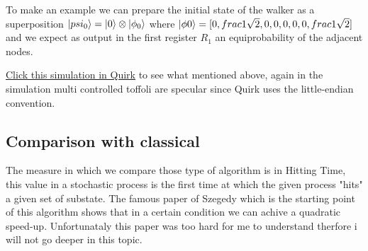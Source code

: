 To make an example we can prepare the initial state of the walker as a superposition $\ket{psi_{0}} = \ket{0} \otimes \ket{\phi_{0}}$
where $\ket{\phi{0}} = [0, frac{1}{\sqrt{2}}, 0 , 0, 0, 0, 0, frac{1}{\sqrt{2}}]$ and we expect as output in the first register $R_{1}$ an equiprobability of the adjacent nodes.

\href{https://algassert.com/quirk#circuit={%22cols%22:[[1,1,1,%22H%22,1,%22X%22],[1,1,1,%22%E2%80%A2%22,%22X%22],[1,1,1,%22Amps3%22],[],[1,1,1,%22Chance3%22],[1,1,%22%E2%80%A2%22,%22X%22,%22%E2%97%A6%22,%22%E2%97%A6%22],[1,1,%22%E2%80%A2%22,1,%22X%22,%22%E2%97%A6%22],[1,1,%22%E2%80%A2%22,1,1,%22X%22],[1,%22%E2%80%A2%22,1,%22X%22,%22%E2%97%A6%22],[1,%22%E2%80%A2%22,1,1,%22X%22],[%22%E2%80%A2%22,1,1,%22X%22],[1,1,1,%22%E2%97%A6%22,%22X%22],[1,1,1,%22H%22],[1,1,1,%22%E2%97%A6%22,%22%E2%80%A2%22,%22Z%22],[1,1,1,%22H%22],[1,1,1,%22%E2%97%A6%22,%22X%22],[1,1,%22%E2%80%A2%22,%22X%22,%22%E2%80%A2%22,%22%E2%80%A2%22],[1,1,%22%E2%80%A2%22,1,%22X%22,%22%E2%80%A2%22],[1,1,%22%E2%80%A2%22,1,1,%22X%22],[1,%22%E2%80%A2%22,1,%22X%22,%22%E2%80%A2%22],[1,%22%E2%80%A2%22,1,1,%22X%22],[%22%E2%80%A2%22,1,1,%22X%22],[1,1,%22Swap%22,1,1,%22Swap%22],[1,%22Swap%22,1,1,%22Swap%22],[%22Swap%22,1,1,%22Swap%22],[%22Amps3%22],[],[%22Chance3%22,1,1,%22Chance3%22]]}}{Click this simulation in Quirk} 
to see what mentioned above, again in the simulation multi controlled toffoli are specular since Quirk uses the little-endian convention.

\subsection{Comparison with classical}

The measure in which we compare those type of algorithm is in Hitting Time, this value in a stochastic process is the first time 
at which the given process "hits" a given set of substate. The famous paper of Szegedy \cite{1366222} which is the starting point of this
algorithm shows that in a certain condition we can achive a quadratic speed-up. Unfortunataly this paper was too hard for me to understand 
therfore i will not go deeper in this topic. 